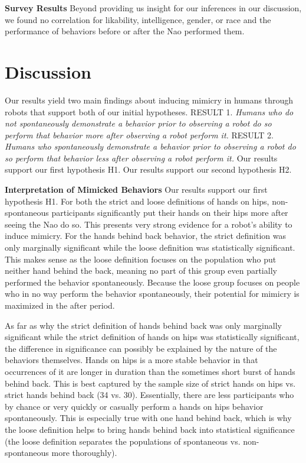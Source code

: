 \documentclass{acm_proc_article-sp}
\begin{document}
\textbf{Survey Results} Beyond providing us insight for our inferences in our discussion, we found no correlation for likability, intelligence, gender, or race and the performance of behaviors before or after the Nao performed them. 

\section{Discussion}
Our results yield two main findings about inducing mimicry in humans through robots that support both of our initial hypotheses.
RESULT 1. \textit{Humans who do not spontaneously demonstrate a behavior prior to observing a robot do so perform that behavior more after observing a robot perform it.}
RESULT 2. \textit{Humans who spontaneously demonstrate a behavior prior to observing a robot do so perform that behavior less after observing a robot perform it.} Our results support our first hypothesis H1. Our results support our second hypothesis H2.

\textbf{Interpretation of Mimicked Behaviors} Our results support our first hypothesis H1. For both the strict and loose definitions of hands on hips, non-spontaneous participants significantly put their hands on their hips more after seeing the Nao do so. This presents very strong evidence for a robot's ability to induce mimicry. For the hands behind back behavior, the strict definition was only marginally significant while the loose definition was statistically significant. This makes sense as the loose definition focuses on the population who put neither hand behind the back, meaning no part of this group even partially performed the behavior spontaneously. Because the loose group focuses on people who in no way perform the behavior spontaneously, their potential for mimicry is maximized in the after period.

As far as why the strict definition of hands behind back was only marginally significant while the strict definition of hands on hips was statistically significant, the difference in significance can possibly be explained by the nature of the behaviors themselves. Hands on hips is a more stable behavior in that occurrences of it are longer in duration than the sometimes short burst of hands behind back. This is best captured by the sample size of strict hands on hips vs. strict hands behind back (34 vs. 30). Essentially, there are less participants who by chance or very quickly or casually perform a hands on hips behavior spontaneously. This is especially true with one hand behind back, which is why the loose definition helps to bring hands behind back into statistical significance (the loose definition separates the populations of spontaneous vs. non-spontaneous more thoroughly).
\end{document}
